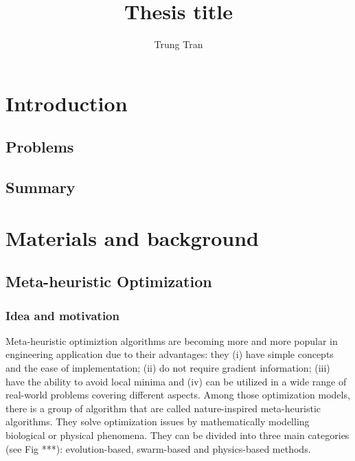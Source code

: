 \documentclass[a4paper,13pt,2p]{report}
\begin{document}
\setlength{\abovedisplayskip}{3pt}
\setlength{\belowdisplayskip}{3pt}

\title{\LARGE {\bf Thesis title}\\
}

\author{Trung Tran}

\normallinespacing
\maketitle


\body

\chapter{Introduction}
\label{ch:introduction}
\section{Problems}
\section{Summary}


\chapter{Materials and background}
\label{ch:background}


\section{Meta-heuristic Optimization}
\label{sec:meta_heuristic}
\subsection{Idea and motivation}
\label{meta_heuristic_idea}
	Meta-heuristic optimiztion algorithms are becoming more and more popular in engineering application due to their advantages: they (i) have simple concepts and the ease of implementation; (ii) do not require gradient information; (iii) have the ability to avoid local minima and (iv) can be utilized in a wide range of real-world problems covering different aspects. Among those optimization models, there is a group of algorithm that are called nature-inspired meta-heuristic algorithms. They solve optimization issues by mathematically modelling biological or physical phenomena. They can be divided into three main categories (see Fig ***): evolution-based, swarm-based and physics-based methods. 
	
\end{document}
